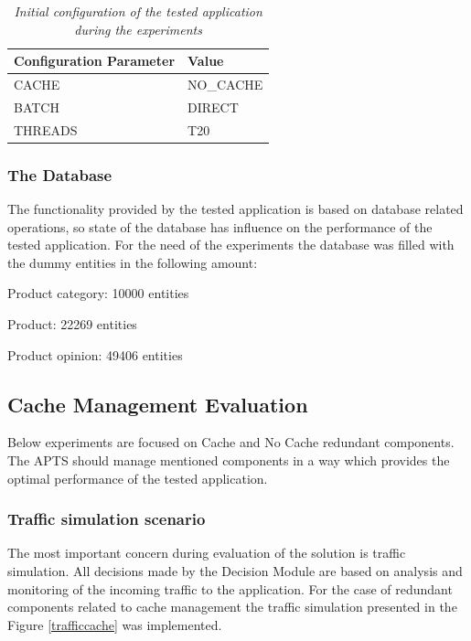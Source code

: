 \documentclass[12pt,a4paper]{article}
\let\tempone\itemize
\let\temptwo\enditemize
\renewenvironment{itemize}{\tempone\addtolength{\itemsep}{-0.4\baselineskip}}{\temptwo}
\begin{document}
\begin{table}[!htb]
\caption{\textit{Initial configuration of the tested application during the experiments}} \label{table:initconfiguration}
\begin{tabularx}{\textwidth}{X|X}
\textbf{Configuration Parameter} & \textbf{Value} \\ \hline
CACHE & NO\_CACHE \\ \hline
BATCH & DIRECT\\ \hline
THREADS & T20\\
\end{tabularx}
\end{table}

\subsubsection{The Database}

The functionality provided by the tested application is based on database related operations, so state of the database has influence on the performance of the tested application. For the need of the experiments the database was filled with the dummy entities in the following amount:

\begin{itemize}
\item Product category: 10000 entities
\item Product: 22269 entities
\item Product opinion: 49406 entities
\end{itemize}


\subsection{Cache Management Evaluation} \label{section:cachemenagementevaluation}

Below experiments are focused on Cache and No Cache redundant components. The APTS should manage mentioned components in a way which provides the optimal performance of the tested application.

\subsubsection{Traffic simulation scenario} \label{trafficcachesim}

The most important concern during evaluation of the solution is traffic simulation. All decisions made by the Decision Module are based on analysis and monitoring of the incoming traffic to the application. For the case of redundant components related to cache management the traffic simulation presented in the Figure \ref{trafficcache} was implemented.
\end{document}
